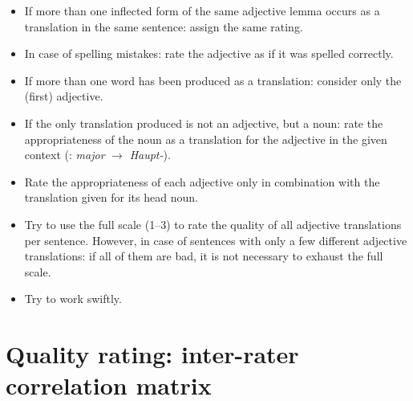 \documentclass[output=paper]{LSP/langsci}
\begin{document}
\begin{itemize}
\item If more than one inflected form of the same adjective lemma
  occurs as a translation in the same sentence:
  assign the same rating.
\item In case of spelling mistakes: rate the adjective as if it was
  spelled correctly.
\item If more than one word has been produced as a translation:
  consider only the (first) adjective.
\item If the only translation produced is not an adjective, but a
  noun: rate the appropriateness of the noun as a translation for the
  adjective in the given context (\eg: {\it major} $\to$ {\it
    Haupt-}).
\item Rate the appropriateness of each adjective only in combination
  with the translation given for its head noun.
\item Try to use the full scale (1--3) to rate the quality of all
  adjective translations per sentence. However, in case of sentences
  with only a few different adjective translations: if all of them are
  bad, it is not necessary to exhaust the full scale.
\item Try to work swiftly.
\end{itemize}
 
\section{Quality rating: inter-rater correlation matrix}
\label{sec:kremer:irc-matrix}

\end{document}
